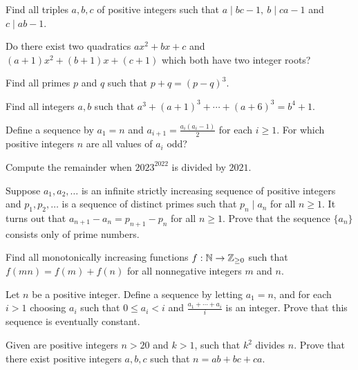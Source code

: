 \begin{problem}{\label{p:n:n:pr:72}}
  Find all triples $a,b,c$ of positive integers such that $a\mid bc-1,\
    b\mid ca-1$ and $c\mid ab-1$.
\end{problem}
\begin{problem}{\label{p:n:n:pr:73}}
  Do there exist two quadratics $ax^2+bx+c$ and $(a+1)x^2+(b+1)x+(c+1)$
    which both have two integer roots?
\end{problem}
\begin{problem}{\label{p:n:n:pr:74}}
  Find all primes $p$ and $q$ such that $p+q=(p-q)^3$.
\end{problem}
\begin{problem}{\label{p:n:n:pr:75}}
  Find all integers $a,b$ such that $a^3+(a+1)^3+\cdots+(a+6)^3=b^4+1$.
\end{problem}
\begin{problem}{\label{p:n:n:pr:76}}
    Define a sequence by $a_1=n$ and $a_{i+1}=\frac{a_i(a_i-1)}2$ for each
    $i\ge 1$. For which positive integers $n$ are all values of $a_i$ odd?
\end{problem}
\begin{problem}{\label{p:n:n:pr:76b}}
  Compute the remainder when $2023^{2022}$ is divided by $2021$.
\end{problem}
\begin{problem}{\label{p:n:n:pr:77}}
    Suppose $a_1,a_2, \dots$ is an infinite strictly increasing sequence of
      positive integers and $p_1, p_2, \dots$ is a sequence of distinct primes
      such that $p_n \mid a_n$ for all $n \ge 1$. It turns out that
      $a_{n+1}-a_n=p_{n+1}-p_n$ for all $n\ge 1$. Prove that the sequence $\{a_n\}$
      consists only of prime numbers.
\end{problem}
\begin{problem}{\label{p:n:n:pr:78}}
  Find all monotonically increasing functions $f:\mathbb{N}\to\mathbb{Z}_{\ge 0}$ such that $f(mn)=f(m)+f(n)$ for
    all nonnegative integers $m$ and $n$.
\end{problem}
\begin{problem}{\label{p:n:n:pr:79}}
  Let $n$ be a positive integer. Define a sequence by letting $a_1=n$, and
    for each $i>1$ choosing $a_i$ such that $0\le a_i<i$ and
    $\frac{a_1+\cdots+a_i}i$ is an integer. Prove that this sequence is
    eventually constant.
\end{problem}
\begin{problem}{\label{p:n:n:pr:80}}
  Given are positive integers $n>20$ and $k>1$, such that $k^2$ divides
      $n$. Prove that there exist
      positive integers $a, b, c$ such that $n=ab+bc+ca$.
\end{problem}
